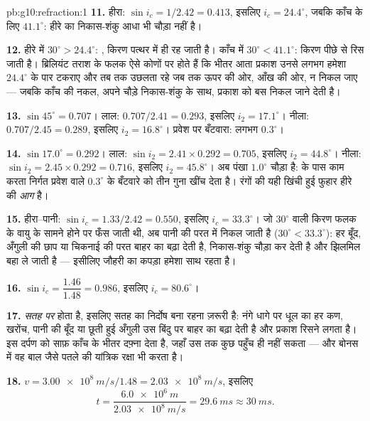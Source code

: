 \begin{solution}{pb:g10:refraction:1}
\textbf{11.} हीरा: $\sin i_c = 1/2.42 = 0.413$, इसलिए $i_c = 24.4^\circ$, जबकि काँच के लिए $41.1^\circ$:
हीरे का निकास-शंकु आधा भी चौड़ा नहीं है।

\textbf{12.} हीरे में $30^\circ > 24.4^\circ$: , किरण
पत्थर में ही रह जाती है। काँच में $30^\circ < 41.1^\circ$: किरण पीछे से रिस जाती है।
ब्रिलियंट तराश के फलक ऐसे कोणों पर होते हैं कि भीतर आता प्रकाश उनसे
लगभग हमेशा $24.4^\circ$ के पार टकराए और तब तक उछलता रहे जब तक ऊपर की ओर,
आँख की ओर, न निकल जाए --- जबकि काँच की नकल, अपने चौड़े निकास-शंकु के
साथ, प्रकाश को बस निकल जाने देती है।

\textbf{13.} $\sin 45^\circ = 0.707$। लाल: $0.707/2.41 = 0.293$, इसलिए $i_2 = 17.1^\circ$। नीला: $0.707/2.45 = 0.289$,
इसलिए $i_2 = 16.8^\circ$। प्रवेश पर बँटवारा: लगभग $0.3^\circ$।

\textbf{14.} $\sin 17.0^\circ = 0.292$। लाल: $\sin i_2 = 2.41 \times
0.292 = 0.705$, इसलिए $i_2 = 44.8^\circ$। नीला: $\sin i_2 = 2.45 \times
0.292 = 0.716$,
इसलिए $i_2 = 45.8^\circ$। अब पंखा $1.0^\circ$ चौड़ा है:  के पास
काम करता निर्गत  प्रवेश वाले $0.3^\circ$ के बँटवारे को तीन
गुना खींच देता है। रंगों की यही खिंची हुई फुहार हीरे की \emph{आग} है।

\textbf{15.} हीरा--पानी: $\sin i_c = 1.33/2.42 = 0.550$, इसलिए $i_c = 33.3^\circ$। जो $30^\circ$ वाली किरण
फलक के वायु के सामने होने पर फँस जाती थी, अब पानी की परत में निकल जाती
है ($30^\circ < 33.3^\circ$): हर बूँद, अँगुली की छाप या चिकनाई की परत बाहर का
 बढ़ा देती है, निकास-शंकु चौड़ा कर देती है और झिलमिल बहा ले
जाती है --- इसीलिए जौहरी का कपड़ा हमेशा साथ रहता है।

\textbf{16.} $\sin i_c = \dfrac{1.46}{1.48} = 0.986$, इसलिए $i_c = 80.6^\circ$।

\textbf{17.}  \emph{सतह पर} होता है,
इसलिए सतह का निर्दोष बना रहना ज़रूरी है: नंगे धागे पर धूल का हर कण,
खरोंच, पानी की बूँद या छूती हुई अँगुली उस बिंदु पर बाहर का 
बढ़ा देती है और प्रकाश रिसने लगता है।  इस दर्पण को साफ़
काँच के भीतर दफ़्ना देता है, जहाँ उस तक कुछ पहुँच ही नहीं सकता --- और
बोनस में वह बाल जैसे पतले  की यांत्रिक रक्षा भी करता है।

\textbf{18.} $v = \qty{3.00e8}{m/s}/1.48 = \qty{2.03e8}{m/s}$, इसलिए
\[
t = \frac{\qty{6.0e6}{m}}{\qty{2.03e8}{m/s}} = \qty{29.6}{ms} \approx
\qty{30}{ms}.
\]


\end{solution}
